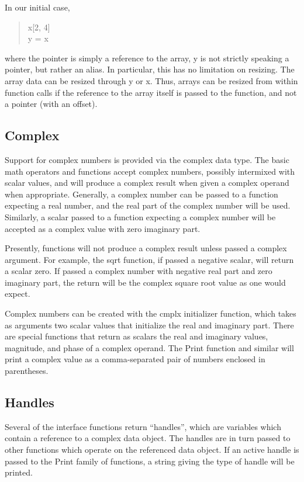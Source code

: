 In our initial case,
\begin{quote}\vt
x[2, 4]\\
y = x
\end{quote}
where the pointer is simply a reference to the array, {\vt y} is not
strictly speaking a pointer, but rather an alias.  In particular, this
has no limitation on resizing.  The array data can be resized through
{\vt y} or {\vt x}.  Thus, arrays can be resized from within function
calls if the reference to the array itself is passed to the function,
and not a pointer (with an offset).

\subsection{Complex}

Support for complex numbers is provided via the complex data type. 
The basic math operators and functions accept complex numbers,
possibly intermixed with scalar values, and will produce a complex
result when given a complex operand when appropriate.  Generally, a
complex number can be passed to a function expecting a real number,
and the real part of the complex number will be used.  Similarly, a
scalar passed to a function expecting a complex number will be
accepted as a complex value with zero imaginary part.

Presently, functions will not produce a complex result unless passed a
complex argument.  For example, the {\vt sqrt} function, if passed a
negative scalar, will return a scalar zero.  If passed a complex
number with negative real part and zero imaginary part, the return
will be the complex square root value as one would expect.

Complex numbers can be created with the {\vt cmplx} initializer
function, which takes as arguments two scalar values that initialize
the real and imaginary part.  There are special functions that return
as scalars the real and imaginary values, magnitude, and phase of a
complex operand.  The {\vt Print} function and similar will print a
complex value as a comma-separated pair of numbers enclosed in
parentheses.

\subsection{Handles}

Several of the interface functions return ``handles'', which are
variables which contain a reference to a complex data object.  The
handles are in turn passed to other functions which operate on the
referenced data object.  If an active handle is passed to the {\vt
Print} family of functions, a string giving the type of handle will be
printed.

